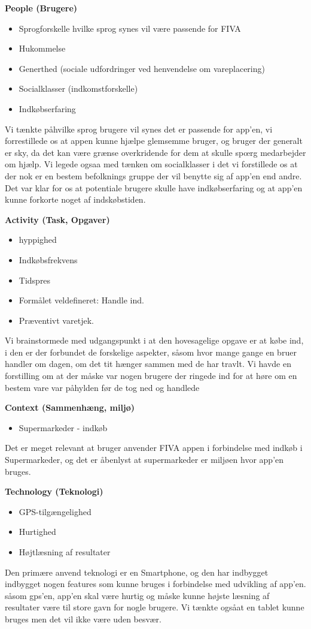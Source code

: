 \documentclass[12pt]{article}
\begin{document}
\textbf{People (Brugere)}
\begin{itemize} 
\item Sprogforskelle hvilke sprog synes vil v\ae re passende for FIVA
\item Hukommelse 
\item Generthed (sociale udfordringer ved henvendelse om vareplacering)
\item Socialklasser (indkomstforskelle)
\item Indkøbserfaring
\end{itemize}
Vi t\ae nkte p\aa hvilke sprog brugere vil synes det er passende for app'en, vi forrestillede os at appen kunne hj\ae lpe glemsemme bruger,
og bruger der generalt er sky, da det kan v\ae re gr\ae nse overkridende for dem at skulle sp\oe rg medarbejder om hj\ae lp. Vi legede ogsaa
med t\ae nken om socialklasser i det vi forstillede os at der nok er en bestem befolknings gruppe der vil benytte sig af app'en end andre.
Det var klar for os at potentiale brugere skulle have indk\o bserfaring og at app'en kunne forkorte noget af indsk\o bstiden.  

\textbf{Activity (Task, Opgaver)} 
\begin{itemize}
\item hyppighed 
\item Indkøbsfrekvens  
\item Tidspres
\item Formålet veldefineret: Handle ind.
\item Præventivt varetjek. 
\end{itemize}
Vi brainstormede med udgangspunkt i at den hovesagelige opgave er at k\o be ind, i den er der forbundet de forskelige aspekter, s\aa  som 
hvor mange gange en bruer handler om dagen, om det tit h\ae nger sammen med de har travlt. Vi havde en forstilling om at der m\aa ske var
nogen brugere der ringede ind for at h\o re om en bestem vare var p\aa  hylden f\o r de tog ned og handlede

\textbf{Context (Sammenh\ae ng, milj\o )}
\begin{itemize}
\item Supermarkeder - indk\o b
\end{itemize}
Det er meget relevant at bruger anvender FIVA appen i forbindelse med indk\o b i Supermarkeder, og det er \aa benlyst at supermarkeder
er milj\o en hvor app'en bruges. 

\textbf{Technology (Teknologi)}
\begin{itemize} 
\item GPS-tilgængelighed
\item Hurtighed
\item Højtlæsning af resultater
\end{itemize}
Den prim\ae re anvend teknologi er en Smartphone, og den har indbygget indbygget nogen features som kunne bruges i forbindelse med udvikling
af app'en. s\aa  som gps'en, app'en skal v\ae re hurtig og m\aa ske kunne h\o jste l\ae sning af resultater v\ae re til store gavn for nogle 
brugere. Vi t\ae nkte ogs\aa  at en tablet kunne bruges men det vil ikke v\ae re uden besv\ae r.   
\newpage
\end{document}
